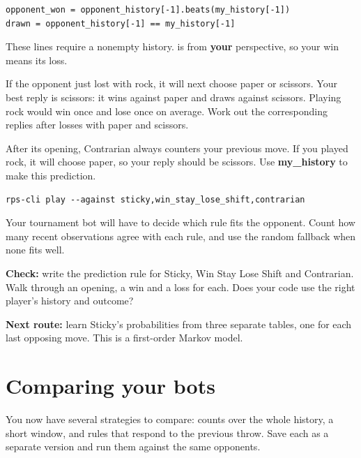 \documentclass[11pt]{article}
\begin{document}
\begin{lstlisting}[style=python,numbers=none,xleftmargin=4pt,framexleftmargin=0pt]
opponent_won = opponent_history[-1].beats(my_history[-1])
drawn = opponent_history[-1] == my_history[-1]
\end{lstlisting}

These lines require a nonempty history.  is from \textbf{your} perspective, so your win means its loss.


If the opponent just lost with rock, it will next choose paper or scissors. Your best reply is scissors: it wins against paper and draws against scissors. Playing rock would win once and lose once on average. Work out the corresponding replies after losses with paper and scissors.



After its opening, Contrarian always counters your previous move. If you played rock, it will choose paper, so your reply should be scissors. Use \textbf{my\_history} to make this prediction.


\begin{lstlisting}[style=shell,numbers=none,xleftmargin=4pt,framexleftmargin=0pt]
rps-cli play --against sticky,win_stay_lose_shift,contrarian
\end{lstlisting}

Your tournament bot will have to decide which rule fits the opponent. Count how many recent observations agree with each rule, and use the random fallback when none fits well.


\begin{checkpoint}
\textbf{Check:} write the prediction rule for Sticky, Win Stay Lose Shift and Contrarian. Walk through an opening, a win and a loss for each. Does your code use the right player's history and outcome?
\end{checkpoint}

\textbf{Next route:} learn Sticky's probabilities from three separate tables, one for each last opposing move. This is a first-order Markov model.
\par
\clearpage
\section*{Comparing your bots}

\begin{context}
You now have several strategies to compare: counts over the whole history, a short window, and rules that respond to the previous throw. Save each as a separate version and run them against the same opponents.

\end{context}
\end{document}
